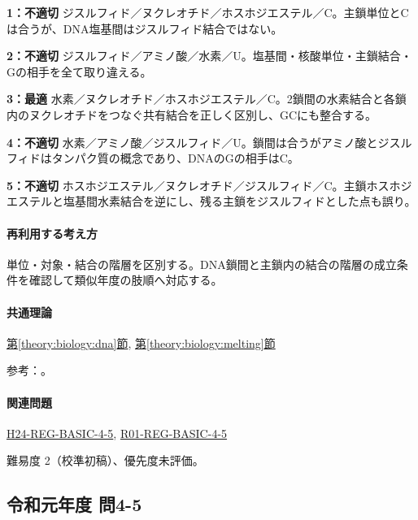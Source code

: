 \noindent\textbf{1：不適切} ジスルフィド／ヌクレオチド／ホスホジエステル／C。主鎖単位とCは合うが、DNA塩基間はジスルフィド結合ではない。\par

\noindent\textbf{2：不適切} ジスルフィド／アミノ酸／水素／U。塩基間・核酸単位・主鎖結合・Gの相手を全て取り違える。\par

\noindent\textbf{3：最適} 水素／ヌクレオチド／ホスホジエステル／C。2鎖間の水素結合と各鎖内のヌクレオチドをつなぐ共有結合を正しく区別し、GCにも整合する。\par

\noindent\textbf{4：不適切} 水素／アミノ酸／ジスルフィド／U。鎖間は合うがアミノ酸とジスルフィドはタンパク質の概念であり、DNAのGの相手はC。\par

\noindent\textbf{5：不適切} ホスホジエステル／ヌクレオチド／ジスルフィド／C。主鎖ホスホジエステルと塩基間水素結合を逆にし、残る主鎖をジスルフィドとした点も誤り。\par

\paragraph{再利用する考え方} 単位・対象・結合の階層を区別する。DNA鎖間と主鎖内の結合の階層の成立条件を確認して類似年度の肢順へ対応する。

\paragraph{共通理論} \hyperref[theory:biology:dna]{第\ref*{theory:biology:dna}節}, \hyperref[theory:biology:melting]{第\ref*{theory:biology:melting}節}

\par 参考：\cite{bu_dna_melting,nhgri_dna}。

\paragraph{関連問題} \hyperref[q:h24-reg-basic-4-5]{H24-REG-BASIC-4-5}, \hyperref[q:r01-reg-basic-4-5]{R01-REG-BASIC-4-5}

\par 難易度 2（校準初稿）、優先度未評価。

\subsection{令和元年度 問4-5}
\label{q:r01-reg-basic-4-5}

